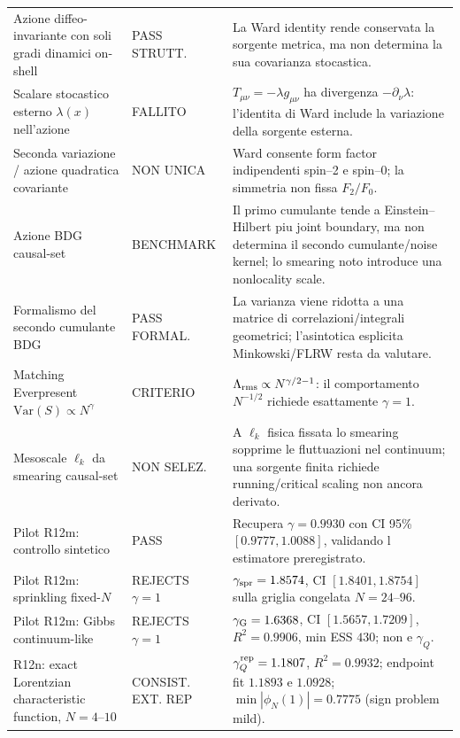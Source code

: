 \documentclass[11pt,a4paper]{article}
\newcommand{\status}[1]{\textsf{#1}}
\begin{document}
\begin{longtable}{p{}p{}p{}}
\addlinespace
Azione diffeo-invariante con soli gradi dinamici on-shell & \status{PASS STRUTT.} & La Ward identity rende conservata la sorgente metrica, ma non determina la sua covarianza stocastica. \\
\addlinespace
Scalare stocastico esterno $\lambda(x)$ nell'azione & \status{FALLITO} & $T_{\mu\nu}=-\lambda g_{\mu\nu}$ ha divergenza $-\partial_\nu\lambda$: l'identita di Ward include la variazione della sorgente esterna. \\
\addlinespace
Seconda variazione / azione quadratica covariante & \status{NON UNICA} & Ward consente form factor indipendenti spin--2 e spin--0; la simmetria non fissa $F_2/F_0$. \\
\addlinespace
Azione BDG causal-set & \status{BENCHMARK} & Il primo cumulante tende a Einstein--Hilbert piu joint boundary, ma non determina il secondo cumulante/noise kernel; lo smearing noto introduce una nonlocality scale. \\
\addlinespace
Formalismo del secondo cumulante BDG & \status{PASS FORMAL.} & La varianza viene ridotta a una matrice di correlazioni/integrali geometrici; l'asintotica esplicita Minkowski/FLRW resta da valutare. \\
\addlinespace
Matching Everpresent $\mathrm{Var}(S)\propto N^\gamma$ & \status{CRITERIO} & $\Lambda_{\rm rms}\propto N^{\gamma/2-1}$: il comportamento $N^{-1/2}$ richiede esattamente $\gamma=1$. \\
\addlinespace
Mesoscale $\ell_k$ da smearing causal-set & \status{NON SELEZ.} & A $\ell_k$ fisica fissata lo smearing sopprime le fluttuazioni nel continuum; una sorgente finita richiede running/critical scaling non ancora derivato. \\
\addlinespace
Pilot R12m: controllo sintetico & \status{PASS} & Recupera $\gamma=0.9930$ con CI 95\% $[0.9777,1.0088]$, validando l estimatore preregistrato. \\
\addlinespace
Pilot R12m: sprinkling fixed-$N$ & \status{REJECTS $\gamma=1$} & $\gamma_{\rm spr}=1.8574$, CI $[1.8401,1.8754]$ sulla griglia congelata $N=24$--$96$. \\
\addlinespace
Pilot R12m: Gibbs continuum-like & \status{REJECTS $\gamma=1$} & $\gamma_{\rm G}=1.6368$, CI $[1.5657,1.7209]$, $R^2=0.9906$, min ESS $430$; non e $\gamma_Q$. \\
\addlinespace
R12n: exact Lorentzian characteristic function, $N=4$--$10$ & \status{CONSIST. EXT. REP} & $\gamma_Q^{\rm rep}=1.1807$, $R^2=0.9932$; endpoint fit $1.1893$ e $1.0928$; $\min|\phi_N(1)|=0.7775$ (sign problem mild). \\

\end{longtable}
\end{document}
